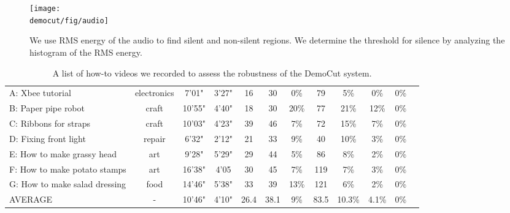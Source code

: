 \begin{figure}[t]
  \centering
\texttt{[image: \\democut/fig/audio]}
  \caption{We use RMS energy of the audio to find silent and non-silent regions. We determine the threshold for silence by analyzing the histogram of the RMS energy.}
  \label{fig:audio}
\end{figure}

\begin{table*}
  \centering
  \small
  \begin{tabular}{|l*{11}{|c}|}
    \hline
     &
     &
     &
     &
     &
     &
     &
     &
     &
     &
     \\ \hline
    A: Xbee tutorial & electronics & 7'01" & 3'27" & 16 & 30 & 0\% & 79 & 5\% & 0\% & 0\% \\
    B: Paper pipe robot & craft & 10'55" & 4'40" & 18 & 30 & 20\% & 77 & 21\% & 12\% & 0\% \\
    C: Ribbons for straps & craft & 10'03" & 4'23" & 39 & 46 & 7\% & 72 & 15\% & 7\% & 0\% \\
    D: Fixing front light & repair & 6'32" & 2'12" & 21 & 33 & 9\% & 40 & 10\% & 3\% & 0\% \\
    E: How to make grassy head & art & 9'28" & 5'29" & 29 & 44 & 5\% & 86 & 8\% & 2\% & 0\% \\
    F: How to make potato stamps & art & 16'38" & 4'05 & 30 & 45 & 7\% & 119 & 7\% & 3\% & 0\% \\
    G: How to make salad dressing & food & 14'46" & 5'38" & 33 & 39 & 13\% & 121 & 6\% & 2\% & 0\% \\ \hline
    AVERAGE & - & 10'46" & 4'10" & 26.4 & 38.1 & 9\% & 83.5 & 10.3\% & 4.1\% & 0\% \\ \hline
  \end{tabular}
  \caption{A list of how-to videos we recorded to assess the robustness of the DemoCut system.}
  \label{tab:system_results}
\end{table*}

